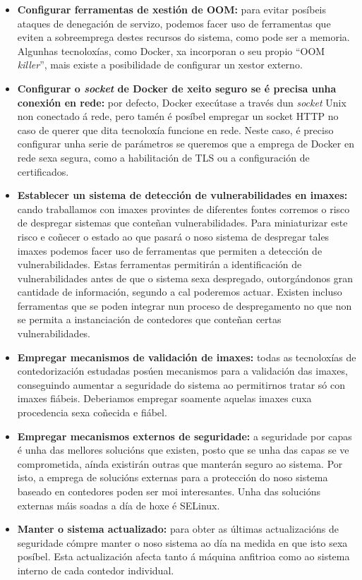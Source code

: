 \begin{itemize}
    \item \textbf{Configurar ferramentas de xestión de \gls{OOM}:} para evitar posíbeis ataques de denegación de servizo, podemos facer uso de ferramentas que eviten a sobreemprega destes recursos do sistema, como pode ser a memoria. Algunhas tecnoloxías, como Docker, xa incorporan o seu propio ``\gls{OOM} \textit{killer}'', mais existe a posibilidade de configurar un xestor externo.
    
    \item \textbf{Configurar o \textit{socket} de Docker de xeito seguro se é precisa unha conexión en rede:} por defecto, Docker execútase a través dun \textit{socket} Unix non conectado á rede, pero tamén é posíbel empregar un socket HTTP no caso de querer que dita tecnoloxía funcione en rede. Neste caso, é preciso configurar unha serie de parámetros se queremos que a emprega de Docker en rede sexa segura, como a habilitación de TLS ou a configuración de certificados.
    
    \item \textbf{Establecer un sistema de detección de vulnerabilidades en imaxes:} cando traballamos con imaxes provintes de diferentes fontes corremos o risco de despregar sistemas que conteñan vulnerabilidades. Para miniaturizar este risco e coñecer o estado ao que pasará o noso sistema de despregar tales imaxes podemos facer uso de ferramentas que permiten a detección de vulnerabilidades. Estas ferramentas permitirán a identificación de vulnerabilidades antes de que o sistema sexa despregado, outorgándonos gran cantidade de información, segundo a cal poderemos actuar. Existen incluso ferramentas que se poden integrar nun proceso de despregamento no que non se permita a instanciación de contedores que conteñan certas vulnerabilidades.
    
    \item \textbf{Empregar mecanismos de validación de imaxes:} todas as tecnoloxías de contedorización estudadas posúen mecanismos para a validación das imaxes, conseguindo aumentar a seguridade do sistema ao permitirnos tratar só con imaxes fiábeis. Deberiamos empregar soamente aquelas imaxes cuxa procedencia sexa coñecida e fiábel.
    
    \item \textbf{Empregar mecanismos externos de seguridade:} a seguridade por capas é unha das mellores solucións que existen, posto que se unha das capas se ve comprometida, aínda existirán outras que manterán seguro ao sistema. Por isto, a emprega de solucións externas para a protección do noso sistema baseado en contedores poden ser moi interesantes. Unha das solucións externas máis soadas a día de hoxe é \gls{SELinux}.
    
    \item \textbf{Manter o sistema actualizado:} para obter as últimas actualizacións de seguridade cómpre manter o noso sistema ao día na medida en que isto sexa posíbel. Esta actualización afecta tanto á máquina anfitrioa como ao sistema interno de cada contedor individual.

\end{itemize}
